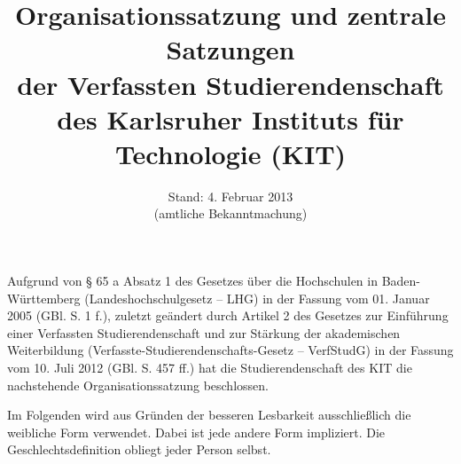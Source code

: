 \documentclass[
	a4paper,
	parskip=half,
	numbers=noenddot,
	titlepage,
	DIV=12,
]{scrartcl}
\title{Organisationssatzung und zentrale Satzungen\\der Verfassten Studierendenschaft\\des Karlsruher Instituts für Technologie (KIT)}
\author{}
\date{Stand: 4. Februar 2013\\(amtliche Bekanntmachung)}
\makeatletter
\newcommand*{\setpartpreamble}[1]{\def\@partpreamble{#1}}
\makeatother
\begin{document}
\maketitle

\cleardoublepage

\begin{multicols}{2}
\tableofcontents
\end{multicols}

\bigskip

Aufgrund von § 65 a Absatz 1 des Gesetzes über die Hochschulen in Baden-Württemberg (Landeshochschulgesetz -- LHG) in der Fassung vom 01. Januar 2005 (GBl. S. 1 f.), zuletzt geändert durch Artikel 2 des Gesetzes zur Einführung einer Verfassten Studierendenschaft und zur Stärkung der akademischen Weiterbildung (Verfasste-Studierendenschafts-Gesetz -- VerfStudG) in der Fassung vom 10. Juli 2012 (GBl. S. 457 ff.) hat die Studierendenschaft des KIT die nachstehende Organisationssatzung beschlossen.

Im Folgenden wird aus Gründen der besseren Lesbarkeit ausschließlich die weibliche Form verwendet. Dabei ist jede andere Form impliziert. Die Geschlechtsdefinition obliegt jeder Person selbst.


\makeatletter
\newcommand*{\@stupadate}{Noch nicht beschlossen}
\newcommand*{\@publishdate}{Noch nicht veröffentlicht}
\newcommand*{\@jurchanges}{Noch nicht veröffentlicht}
\newcommand*{\stupadate}[1]{\renewcommand*{\@stupadate}{#1}}
\newcommand*{\publishdate}[1]{\renewcommand*{\@publishdate}{#1}}
\newcommand*{\jurchanges}[1]{\renewcommand*{\@jurchanges}{Eingearbeitete Änderungen:\begin{itemize}#1\end{itemize}}}


\newenvironment{jurdoc}[2][]{%
\ifthenelse{\isempty{#1}}{\def\@jurshorttitle{#2}}{\def\@jurshorttitle{#1}}

\setpartpreamble{%
	\begin{center}
		\Large
		\begin{tabular}{ll}
		Beschluss: & \@stupadate \\
		Veröffentlichung: & \@publishdate \\
		\end{tabular}
	\end{center}
	\vfil
	\@jurchanges
}
\part[\@jurshorttitle]{#2}

\begin{multicols}{2}%
\begin{contract}%
\setcounter{Paragraph}{0}%
\setcounter{juratoclevel}{1}%
%
}{%
\end{contract}%
\end{multicols}%
}%

\makeatother








\end{document}
